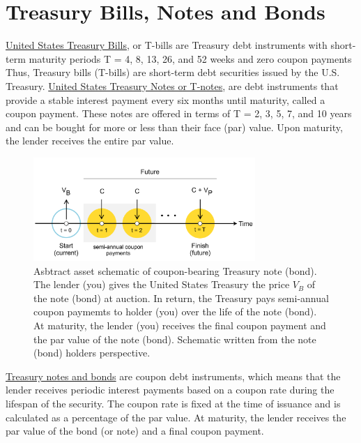 \documentclass[11pt]{article}
\theoremstyle{definition}
\begin{document}
\section*{Treasury Bills, Notes and Bonds}\label{sec:treasury-bills}
\href{https://treasurydirect.gov/marketable-securities/treasury-bills/}{United States Treasury Bills}, or T-bills are Treasury debt instruments with short-term maturity periods T = 4, 8, 13, 26, and 52 weeks and zero coupon payments
Thus, Treasury bills (T-bills) are short-term debt securities issued by the U.S. Treasury. \href{https://treasurydirect.gov/marketable-securities/treasury-notes/}{United States Treasury Notes or T-notes}, 
are debt instruments that provide a stable interest payment every six months until maturity, called a coupon payment.
These notes are offered in terms of T = 2, 3, 5, 7, and 10 years and can be bought for more or less than their face (par) value. 
Upon maturity, the lender receives the entire par value. 
\begin{figure}[h]
    \centering
    \includegraphics[width=0.75\textwidth]{./figs/Fig-Bond-Asset-Timeline-Schematic.pdf}
    \caption{Asbtract asset schematic of coupon-bearing Treasury note (bond). The lender (you) gives the United States Treasury 
    the price $V_{B}$ of the note (bond) at auction. In return, the Treasury pays semi-annual coupon paymemts to holder (you) 
    over the life of the note (bond). At maturity, the lender (you) receives the final coupon payment
    and the par value of the note (bond). Schematic written from the note (bond) holders perspective.}\label{fig:govt-note-bound-schematic}
\end{figure}
\href{https://treasurydirect.gov/marketable-securities/treasury-bonds/}{Treasury notes and bonds} are coupon debt instruments, which means that the lender receives periodic interest payments based on a coupon rate during the lifespan of the security. 
The coupon rate is fixed at the time of issuance and is calculated as a percentage of the par value. 
At maturity, the lender receives the par value of the bond (or note) and a final coupon payment.
\end{document}
